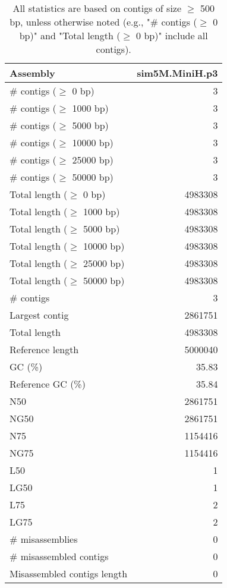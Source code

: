 \documentclass[12pt,a4paper]{article}
\begin{document}
\begin{table}[ht]
\begin{center}
\caption{All statistics are based on contigs of size $\geq$ 500 bp, unless otherwise noted (e.g., "\# contigs ($\geq$ 0 bp)" and "Total length ($\geq$ 0 bp)" include all contigs).}
\begin{tabular}{|l*{1}{|r}|}
\hline
Assembly & sim5M.MiniH.p3 \\ \hline
\# contigs ($\geq$ 0 bp) & 3 \\ \hline
\# contigs ($\geq$ 1000 bp) & 3 \\ \hline
\# contigs ($\geq$ 5000 bp) & 3 \\ \hline
\# contigs ($\geq$ 10000 bp) & 3 \\ \hline
\# contigs ($\geq$ 25000 bp) & 3 \\ \hline
\# contigs ($\geq$ 50000 bp) & 3 \\ \hline
Total length ($\geq$ 0 bp) & 4983308 \\ \hline
Total length ($\geq$ 1000 bp) & 4983308 \\ \hline
Total length ($\geq$ 5000 bp) & 4983308 \\ \hline
Total length ($\geq$ 10000 bp) & 4983308 \\ \hline
Total length ($\geq$ 25000 bp) & 4983308 \\ \hline
Total length ($\geq$ 50000 bp) & 4983308 \\ \hline
\# contigs & 3 \\ \hline
Largest contig & 2861751 \\ \hline
Total length & 4983308 \\ \hline
Reference length & 5000040 \\ \hline
GC (\%) & 35.83 \\ \hline
Reference GC (\%) & 35.84 \\ \hline
N50 & 2861751 \\ \hline
NG50 & 2861751 \\ \hline
N75 & 1154416 \\ \hline
NG75 & 1154416 \\ \hline
L50 & 1 \\ \hline
LG50 & 1 \\ \hline
L75 & 2 \\ \hline
LG75 & 2 \\ \hline
\# misassemblies & 0 \\ \hline
\# misassembled contigs & 0 \\ \hline
Misassembled contigs length & 0 \\ \hline

\end{tabular}
\end{center}
\end{table}
\end{document}
